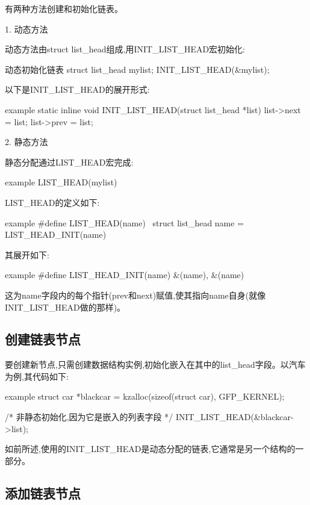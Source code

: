 \documentclass[lang=cn,newtx,10pt,scheme=chinese]{elegantbook}
\begin{document}
有两种方法创建和初始化链表。

1. 动态方法

动态方法由struct list\_head组成,用INIT\_LIST\_HEAD宏初始化:

\begin{mycode}{动态初始化链表}
struct list_head mylist;
INIT_LIST_HEAD(&mylist);
\end{mycode}

以下是INIT\_LIST\_HEAD的展开形式:

\begin{mycode}{example}
static inline void INIT_LIST_HEAD(struct list_head *list)
{
    list->next = list;
    list->prev = list;
}
\end{mycode}

2. 静态方法

静态分配通过LIST\_HEAD宏完成:

\begin{mycode}{example}
LIST_HEAD(mylist)
\end{mycode}

LIST\_HEAD的定义如下:

\begin{mycode}{example}
#define LIST_HEAD(name) \
    struct list_head name = LIST_HEAD_INIT(name)
\end{mycode}

其展开如下:

\begin{mycode}{example}
#define LIST_HEAD_INIT(name) { &(name), &(name) }
\end{mycode}

这为name字段内的每个指针(prev和next)赋值,使其指向name自身(就像INIT\_LIST\_HEAD做的那样)。

\subsection{创建链表节点}

要创建新节点,只需创建数据结构实例,初始化嵌入在其中的list\_head字段。以汽车为例,其代码如下:

\begin{mycode}{example}
struct car *blackcar = kzalloc(sizeof(struct car), GFP_KERNEL);

/* 非静态初始化,因为它是嵌入的列表字段 */
INIT_LIST_HEAD(&blackcar->list);
\end{mycode}

如前所述,使用的INIT\_LIST\_HEAD是动态分配的链表,它通常是另一个结构的一部分。

\subsection{添加链表节点}
\end{document}

